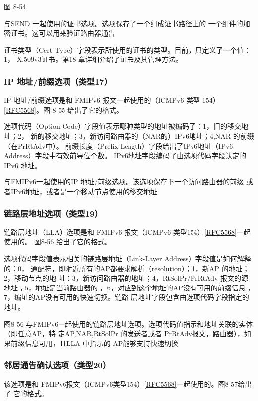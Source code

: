 图 8-54

与SEND 一起使用的证书选项。选项保存了一个组成证书路径上的
一个组件的加密证书。这可以用来验证路由器通告

证书类型（Cert Type）字段表示所使用的证书的类型。目前，只定义了一个值：1，
X.509v3证书。第18 章详细介绍了证书及其管理方法。

\subsubsection{IP 地址/前缀选项（类型17）}
IP 地址/前缀选项是和 FMIPv6 报文一起使用的（ICMPv6 类型 154）\href{https://www.rfc-editor.org/rfc/rfc5568}{[RFC5568]}。图
8-55 给出了它的格式。

选项代码（Option-Code）字段值表示哪种类型的地址被编码了：1，旧的移交地址；2，
新的移交地址；3，新访问路由器的（NAR的）IPv6地址；4,NAR 的前缀（在PrRtAdv中）。
前缀长度（Prefix Length）字段给出了IPv6地址（IPv6 Address）字段中有效前导位个数。
IPv6地址字段编码了由选项代码字段认定的 IPv6 地址。

与FMIPv6一起使用的IP 地址/前缀选项。该选项保存下一个访问路由器的前缀
或者IPv6地址，或者是一个移动节点使用的移交地址

\subsubsection{链路层地址选项（类型19）}
链路层地址（LLA）选项是和 FMIPv6 报文（ICMPv6 类型154）\href{https://www.rfc-editor.org/rfc/rfc5568}{[RFC5568]}一起使用的。
图8-56 给出了它的格式。

选项代码字段值表示相关的链路层地址（Link-Layer Address）字段值是如何解释的：0，
通配符，即附近所有的AP都要求解析（resolution）；1，新AP 的地址；2，移动节点的地
址：3，新访问路由器的地址；4，RtSolPr/PrRtAdv 报文的源地址；5，地址是当前路由器的；
6，对应到这个地址的AP没有可用的前缀信息；7，编址的AP没有可用的快速切换。链路
层地址字段包含由选项代码字段指定的地址。

图8-56 与FMIPv6一起使用的链路层地址选项。选项代码值指示和地址关联的实体（即任意AP，特
定AP,NAR,RtSolPr 的发送者或者 PrRtAdv报文，路由器），如果前缀信息可用，且LLA
中指示的 AP能够支持快速切换

\subsubsection{邻居通告确认选项（类型20）}
该选项是和 FMIPv6报文（ICMPv6类型154）\href{https://www.rfc-editor.org/rfc/rfc5568}{[RFC5568]}一起使用的。图8-57给出了
它的格式。

